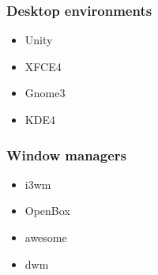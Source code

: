 \begin{frame}
    \frametitle{Desktop environments}
    \begin{itemize}
        \item<1 -> Unity
        \item<2 -> XFCE4
        \item<3 -> Gnome3
        \item<4 -> KDE4
    \end{itemize}
\end{frame}
\begin{frame}
    \frametitle{Window managers}
    \begin{itemize}
        \item<1 -> i3wm
        \item<2 -> OpenBox
        \item<3 -> awesome
        \item<4 -> dwm
    \end{itemize}
\end{frame}
